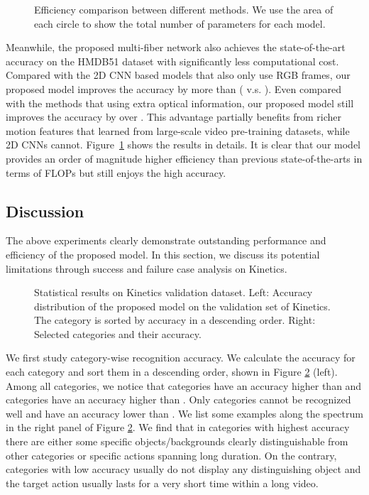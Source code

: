 \documentclass[runningheads]{llncs}
\newcommand{\ourslong}[0]{multi-fiber\xspace}
\begin{document}
\begin{figure}
\centering
{}
\caption{Efficiency comparison between different methods. We use the area of each circle to show the total number of parameters for each model.}
\label{fig_ucf_hmdb}
\end{figure}
Meanwhile, the proposed \ourslong network also achieves the state-of-the-art accuracy on the HMDB51 dataset with significantly less computational cost. Compared with the 2D CNN based models that also only use RGB frames, our proposed model improves the accuracy by more than  ( v.s. ). Even compared with the methods that using extra optical information, our proposed model still improves the accuracy by over . This advantage partially benefits from richer motion features that learned from large-scale video pre-training datasets, while 2D CNNs cannot. Figure~\ref{fig_ucf_hmdb} shows the results in details. It is clear that our model provides an order of magnitude higher efficiency than previous state-of-the-arts in terms of FLOPs but still enjoys the high accuracy.

 
\subsection{Discussion}
\label{sec:discussion}

The above experiments clearly demonstrate outstanding performance and efficiency of the proposed model. In this section, we discuss its potential limitations through success and failure case analysis on Kinetics.
\begin{figure}[h]
	\center
	\caption{Statistical results on Kinetics validation dataset. Left: Accuracy distribution of the proposed model on the validation set of Kinetics. The category is sorted by accuracy in a descending order. Right: Selected categories and their accuracy.}
	\label{fig_acc_dist}
\end{figure}

We first study category-wise recognition accuracy. We calculate the accuracy for each category and sort them in a descending order, shown in Figure \ref{fig_acc_dist} (left). Among all  categories, we notice that  categories have an accuracy higher than  and  categories have an accuracy higher than . Only  categories cannot be recognized well and have an accuracy lower than . We list some examples along the spectrum in the right panel of Figure \ref{fig_acc_dist}. We find that in  categories with highest accuracy there are either some specific objects/backgrounds clearly distinguishable from other categories or specific actions spanning long duration. On the contrary, categories with low accuracy usually do not display any distinguishing object and the target action usually lasts for a very short time within a long video.
\end{document}

